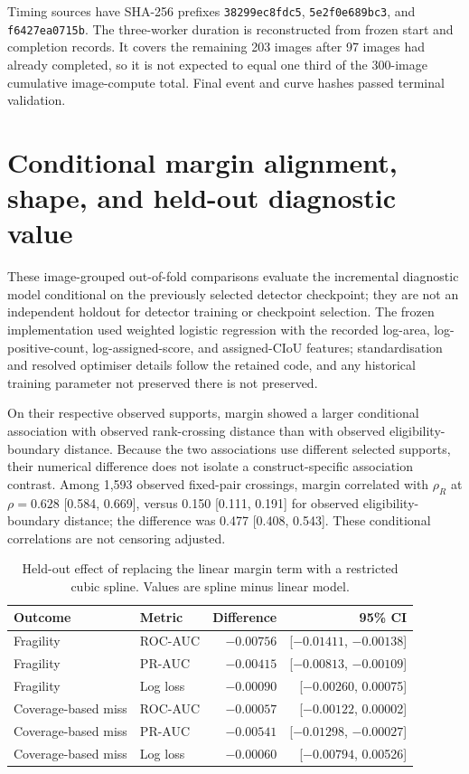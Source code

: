 \documentclass[preprint,10pt]{elsarticle}
\begin{document}
Timing sources have SHA-256 prefixes \texttt{38299ec8fdc5}, \texttt{5e2f0e689bc3}, and \texttt{f6427ea0715b}. The three-worker duration is reconstructed from frozen start and completion records. It covers the remaining 203 images after 97 images had already completed, so it is not expected to equal one third of the 300-image cumulative image-compute total. Final event and curve hashes passed terminal validation.

\section{Conditional margin alignment, shape, and held-out diagnostic value}

These image-grouped out-of-fold comparisons evaluate the incremental diagnostic model conditional on the previously selected detector checkpoint; they are not an independent holdout for detector training or checkpoint selection. The frozen implementation used weighted logistic regression with the recorded log-area, log-positive-count, log-assigned-score, and assigned-CIoU features; standardisation and resolved optimiser details follow the retained code, and any historical training parameter not preserved there is not preserved.

On their respective observed supports, margin showed a larger conditional association with observed rank-crossing distance than with observed eligibility-boundary distance. Because the two associations use different selected supports, their numerical difference does not isolate a construct-specific association contrast. Among 1,593 observed fixed-pair crossings, margin correlated with $\rho_R$ at $\rho=0.628$ [0.584, 0.669], versus 0.150 [0.111, 0.191] for observed eligibility-boundary distance; the difference was 0.477 [0.408, 0.543]. These conditional correlations are not censoring adjusted.

\begin{table}[ht]
\centering
\caption{Held-out effect of replacing the linear margin term with a restricted cubic spline. Values are spline minus linear model.}
\begin{tabular}{@{}llrr@{}}
\toprule
Outcome & Metric & Difference & 95\% CI \\
\midrule
Fragility & ROC-AUC & $-0.00756$ & [$-0.01411$, $-0.00138$] \\
Fragility & PR-AUC & $-0.00415$ & [$-0.00813$, $-0.00109$] \\
Fragility & Log loss & $-0.00090$ & [$-0.00260$, 0.00075] \\
Coverage-based miss & ROC-AUC & $-0.00057$ & [$-0.00122$, 0.00002] \\
Coverage-based miss & PR-AUC & $-0.00541$ & [$-0.01298$, $-0.00027$] \\
Coverage-based miss & Log loss & $-0.00060$ & [$-0.00794$, 0.00526] \\
\bottomrule
\end{tabular}
\end{table}
\end{document}
